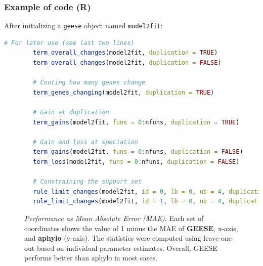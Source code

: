 \documentclass[aspectratio=169,9pt,handout]{beamer}
\begin{document}
\begin{frame}[fragile]
	\frametitle{Example of code (R)}
	
	After initializing a \texttt{geese} object named \texttt{model2fit}:\pause
	
	\begin{lstlisting}[language=R] 
		# For later use (see last two lines)
		term_overall_changes(model2fit, duplication = TRUE)
		term_overall_changes(model2fit, duplication = FALSE)
		
		# Couting how many genes change
		term_genes_changing(model2fit, duplication = TRUE)
		
		# Gain at duplication
		term_gains(model2fit, funs = 0:nfuns, duplication = TRUE)
		
		# Gain and loss at speciation
		term_gains(model2fit, funs = 0:nfuns, duplication = FALSE)
		term_loss(model2fit, funs = 0:nfuns, duplication = FALSE)
		
		# Constraining the support set
		rule_limit_changes(model2fit, id = 0, lb = 0, ub = 4, duplication = TRUE)
		rule_limit_changes(model2fit, id = 1, lb = 0, ub = 4, duplication = FALSE)\end{lstlisting}
	
\end{frame}

\begin{frame}
	\begin{figure}
		\caption{\textit{Performance as Mean Absolute Error (MAE)}. Each set of coordinates shows the value of 1 minus the MAE of \textbf{GEESE}, x-axis, and \textbf{aphylo} (y-axis). The statistics were computed using leave-one-out based on individual parameter estimates. Overall, GEESE performs better than aphylo in most cases.}
	\end{figure}
\end{frame}
\end{document}
